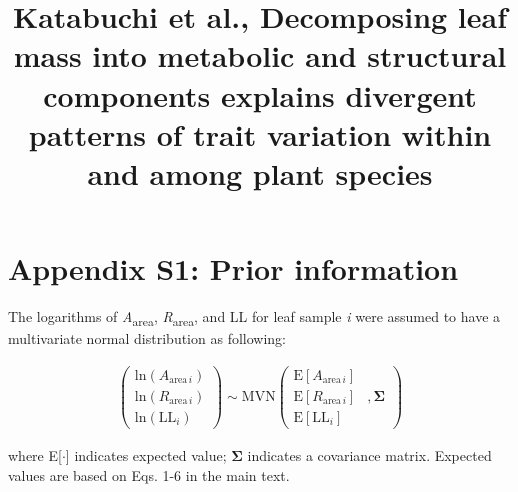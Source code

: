 \documentclass[
  12pt,
  letterpaper,
  DIV=11,
  numbers=noendperiod]{scrartcl}
\title{Katabuchi et al., Decomposing leaf mass into metabolic and
structural components explains divergent patterns of trait variation
within and among plant species}
\author{}
\date{}
\renewcommand*\contentsname{Table of contents}
\newcommand\contentsname{Table of contents}
\begin{document}
\maketitle
\ifdefined\Shaded\renewenvironment{Shaded}{\begin{tcolorbox}[frame hidden, enhanced, sharp corners, breakable, borderline west={3pt}{0pt}{shadecolor}, interior hidden, boxrule=0pt]}{\end{tcolorbox}}\fi

\renewcommand*\contentsname{Table of contents}
{
\hypersetup{linkcolor=}
\setcounter{tocdepth}{3}
\tableofcontents
}
\newpage

\hypertarget{appendix-s1-prior-information}{%
\section{Appendix S1: Prior
information}\label{appendix-s1-prior-information}}

The logarithms of \emph{A}\textsubscript{area},
\emph{R}\textsubscript{area}, and LL for leaf sample \emph{i} were
assumed to have a multivariate normal distribution as following:

\begin{align}
\left(
\begin{array}{ccc}
\mathrm{ln}(A_{\mathrm{area} \, i})\\
\mathrm{ln}(R_{\mathrm{area} \, i}) \\
\mathrm{ln}(\mathrm{LL}_i)
\end{array}
\right)
\sim \mathrm{MVN}
\left(
\begin{array}{rrr}
\mathrm{E}[A_{\mathrm{area} \, i}]\\
\mathrm{E}[R_{\mathrm{area} \, i}] &, \boldsymbol{\Sigma}\\
\mathrm{E}[\mathrm{LL}_i]
\end{array}
\right) \tag{S1}
\end{align}

where E{[}\(\cdot\){]} indicates expected value; \(\boldsymbol{\Sigma}\)
indicates a covariance matrix. Expected values are based on Eqs. 1-6 in
the main text.
\end{document}
